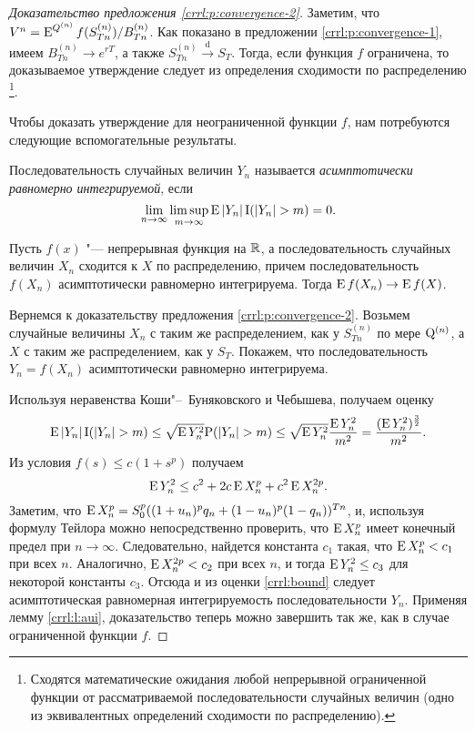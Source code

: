 \begin{proof}[Доказательство предложения \ref{crrl:p:convergence-2}]
Заметим, что $V^n = \operatorname{E}^{Q^{(n)}} f(S_{Tn}^{(n)}) / B_{Tn}^{(n)}$. 
Как показано в предложении \ref{crrl:p:convergence-1}, имеем $B_{Tn}^{(n)} \to e^{rT}$, а также $S_{Tn}^{(n)} \xrightarrow{\text{d}} S_T$.
Тогда, если функция $f$ ограничена, то доказываемое утверждение следует из определения сходимости по распределению%
\footnote{Сходятся математические ожидания любой непрерывной ограниченной функции от рассматриваемой последовательности случайных величин (одно из эквивалентных определений сходимости по распределению).}.

Чтобы доказать утверждение для неограниченной функции $f$, нам потребуются следующие вспомогательные результаты.

\begin{definition}
Последовательность случайных величин $Y_n$ называется \emph{асимптотически равномерно интегрируемой}, если 
\[
\lim_{n\to\infty} \limsup_{m\to\infty} \E|Y_n| \I(|Y_n|>m) = 0.
\]
\end{definition}

\begin{lemma}
\label{crrl:l:aui}
Пусть $f(x)$ "--- непрерывная функция на $\mathbb{R}$, а последовательность случайных величин $X_n$ сходится к $X$ по распределению, причем последовательность $f(X_n)$ асимптотически равномерно интегрируема.
Тогда $\operatorname{E} f(X_n) \to \operatorname{E} f(X)$. 
\end{lemma}

Вернемся к доказательству предложения \ref{crrl:p:convergence-2}. Возьмем случайные величины $X_n$ с таким же распределением, как у $S_{Tn}^{(n)}$ по мере $\mathrm{Q}^{(n)}$, а $X$ с таким же распределением, как у $S_T$.
Покажем, что последовательность $Y_n = f(X_n)$ асимптотически равномерно интегрируема.  

Используя неравенства Коши"--~Буняковского и Чебышева, получаем оценку
\begin{equation}
\label{crrl:bound}
\E|Y_n| \I(|Y_n|>m) \le \sqrt{\E Y_n^2} \P(|Y_n| > m) \le \sqrt{\E Y_n^2} \frac{\E Y_n^2}{m^2} = \frac{(\E Y_n^2)^{\frac32}}{m^2}.
\end{equation}
Из условия $f(s) \le c(1+s^p)$ получаем
\[
\operatorname{E} Y_n^2 \le  c^2 + 2c\operatorname{E} X_n^p + c^2\operatorname{E} X_n^{2p}.
\]
Заметим, что $\operatorname{E} X_n^p = S_0^p ((1+u_n)^p q_n + (1-u_n)^p(1-q_n))^{Tn}$, и, используя формулу Тейлора можно непосредственно проверить, что $\operatorname{E} X_n^p$ имеет конечный предел при $n\to \infty$.
Следовательно, найдется константа $c_1$ такая, что $\operatorname{E} X_n^p < c_1$ при всех $n$.
Аналогично, $\operatorname{E} X_n^{2p} < c_2$ при всех $n$, и тогда $\operatorname{E} Y_n^2 \le c_3$ для некоторой константы $c_3$.
Отсюда и из оценки \eqref{crrl:bound} следует асимптотическая равномерная интегрируемость последовательности $Y_n$.
Применяя лемму \ref{crrl:l:aui}, доказательство теперь можно завершить так же, как в случае ограниченной функции $f$. 
\end{proof}
